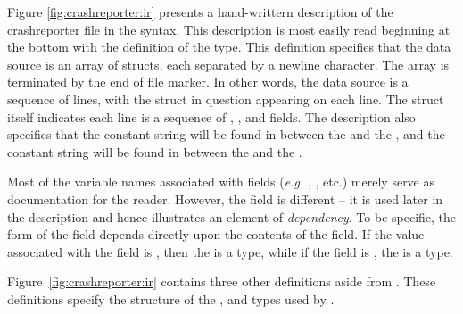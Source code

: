 Figure \ref{fig:crashreporter:ir} presents a hand-writtern description
of the crashreporter file in the \ir{} syntax.  This
description is most easily read beginning at the bottom
with the definition of the  type.  This definition specifies that
the data source is an
array of structs, each separated by a newline character. The array
is terminated by the end of file marker.  In other words,
the data source is a sequence of lines, with the struct
in question appearing on each line.  
The struct itself indicates each line is a sequence of
, ,  and  fields.  
The description also specifies that the constant string \cd{"["} 
will be found in between the  and the , and the
constant string \cd{"]: "} will be found in between the  and 
the .


Most of the variable names associated with fields ({\em e.g.}
, , etc.) merely serve as documentation for the reader.
However, the  field is different -- it is used later in the 
description and hence illustrates an element of {\em dependency}.  
To be specific, the form of the
 field depends directly upon the contents of the 
field.  If the value associated with the
 field is , then the  is
a  type, while if the  field is ,
the  is a  type.  

Figure~\ref{fig:crashreporter:ir} contains three other definitions
aside from .  These definitions specify the
structure of the  ,  and 
types used by .





